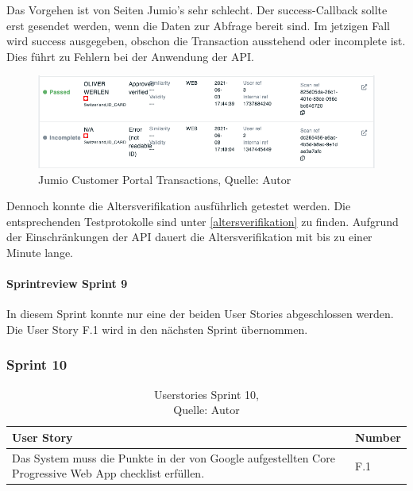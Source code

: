 Das Vorgehen ist von Seiten Jumio's sehr schlecht. Der success-Callback sollte erst gesendet werden, wenn die Daten zur Abfrage bereit sind. Im jetzigen Fall wird success ausgegeben, obschon die Transaction ausstehend oder incomplete ist. Dies führt zu Fehlern bei der Anwendung der API. 
 \begin{figure}[H]
	\centering
	\includegraphics[width=1\textwidth]{images/jumioIncomplete.PNG}
	\caption[Jumio Customer Portal Transactions]{Jumio Customer Portal Transactions, Quelle: Autor}
	\label{img: jumioIncomplete}
\end{figure} 

Dennoch konnte die Altersverifikation ausführlich getestet werden. Die entsprechenden Testprotokolle sind unter \ref{altersverifikation} zu finden. Aufgrund der Einschränkungen der API dauert die Altersverifikation mit bis zu einer Minute lange. 

\paragraph{Sprintreview Sprint 9}
In diesem Sprint konnte nur eine der beiden User Stories abgeschlossen werden. Die \gls{User Story} F.1 wird in den nächsten Sprint übernommen. 

\subsubsection{Sprint 10}
\begin{table}[H]
	\setlength\extrarowheight{2pt} %
	\begin{tabularx}{\textwidth}{|X|l|}
		\hline
		\textbf{User Story} & \textbf{Number} \\
		\hline
		Das System muss die Punkte in der von Google aufgestellten Core Progressive Web App checklist erfüllen. & F.1\\
		\hline
		
		\hline
	\end{tabularx} 
	\caption[Userstories Sprint 10]{Userstories Sprint 10,\\ Quelle: Autor}
\end{table}\label{userStoriesSprint10}
